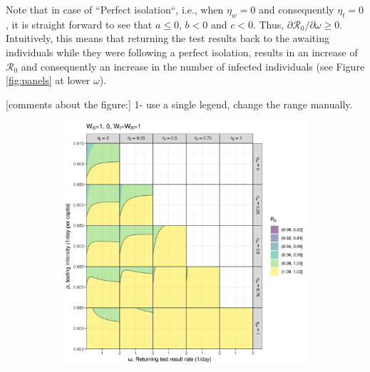 \documentclass{article}
\newcommand{\Rnum}{\mathcal{R}_0}
\theoremstyle{definition} %
\begin{document}
 
Note that in case of ``Perfect isolation``, i.e., when $\eta_w=0$ and consequently $\eta_t=0$, it is straight forward to see that $a \leq 0$, $b<0$ and $c<0$. Thus, $\partial{\Rnum}/\partial{\omega} \geq 0$. Intuitively, this means that returning the test results back to the awaiting individuals while they were following a perfect isolation, results in an increase of $\Rnum$ and consequently an increase in the number of infected individuals (see Figure \ref{fig:panels} at lower $\omega$).

[comments about the figure:]
1- use a single legend, change the range manually.
\begin{figure}[h!]
\centering
\begin{subfigure}[t]{.45\textwidth}
\centering
\includegraphics[width=\linewidth]{./pix/R0contour_random.png}
\end{subfigure}
%
\begin{subfigure}[t]{.45\textwidth}
\centering

\end{subfigure}
\end{figure}
\end{document}
